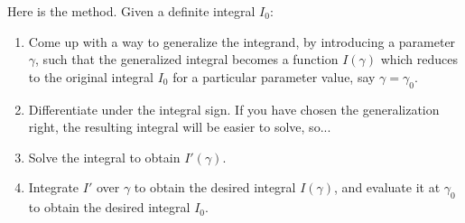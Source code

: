 \documentclass[10pt,a4paper]{article}
\begin{document}
Here is the method.  Given a definite integral $I_0$:
\begin{enumerate}
\item Come up with a way to generalize the integrand, by introducing a
  parameter $\gamma$, such that the generalized integral becomes a
  function $I(\gamma)$ which reduces to the original integral $I_0$
  for a particular parameter value, say $\gamma = \gamma_0$.

\item Differentiate under the integral sign. If you have chosen the
  generalization right, the resulting integral will be easier to
  solve, so...

\item Solve the integral to obtain $I'(\gamma)$.

\item Integrate $I'$ over $\gamma$ to obtain the desired integral
  $I(\gamma)$, and evaluate it at $\gamma_0$ to obtain the desired
  integral $I_0$.
\end{enumerate}
\end{document}
